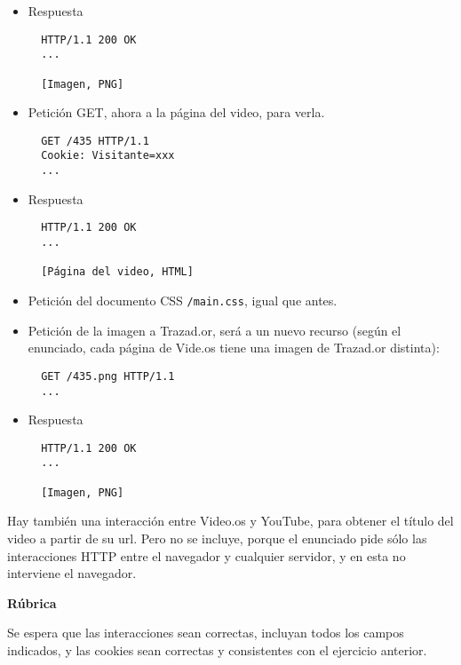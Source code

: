 \begin{itemize}
\item Respuesta

\begin{verbatim}
  HTTP/1.1 200 OK
  ...

  [Imagen, PNG]
\end{verbatim}
  
\item Petición GET, ahora a la página del video, para verla.

\begin{verbatim}
  GET /435 HTTP/1.1
  Cookie: Visitante=xxx
  ...
\end{verbatim}

\item Respuesta

\begin{verbatim}
  HTTP/1.1 200 OK
  ...

  [Página del video, HTML]
\end{verbatim}

\item Petición del documento CSS \texttt{/main.css}, igual que antes.

\item Petición de la imagen a Trazad.or, será a un nuevo recurso (según el enunciado, cada página de Vide.os tiene una imagen de Trazad.or distinta):

  \begin{verbatim}
  GET /435.png HTTP/1.1
  ...
\end{verbatim}

\item Respuesta

\begin{verbatim}
  HTTP/1.1 200 OK
  ...

  [Imagen, PNG]
\end{verbatim}
  
\end{itemize}

Hay también una interacción entre Video.os y YouTube, para obtener el título del video a partir de su url. Pero no se incluye, porque el enunciado pide sólo las interacciones HTTP entre el navegador y cualquier servidor, y en esta no interviene el navegador.

\vspace{.4cm}\textbf{Rúbrica}

Se espera que las interacciones sean correctas, incluyan todos los campos indicados, y las cookies sean correctas y consistentes con el ejercicio anterior.

